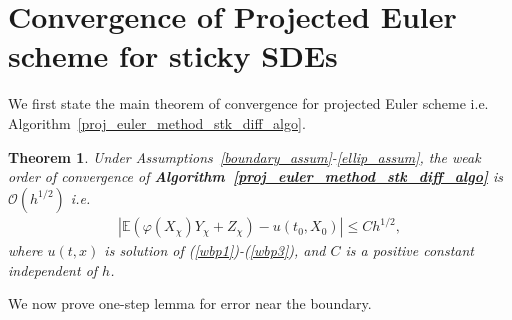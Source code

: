 \documentclass{article}
\newtheorem{theorem}{Theorem}[section]
\theoremstyle{definition}
\numberwithin{equation}{section}
\begin{document}
\section{Convergence of Projected Euler scheme for sticky SDEs}\label{sticky_proj_euler_section}

We first state the main theorem of convergence for projected Euler scheme i.e. Algorithm~\ref{proj_euler_method_stk_diff_algo}. 

\begin{theorem}\label{proj_conv_thrm}
Under Assumptions~\ref{boundary_assum}-\ref{ellip_assum}, the weak order of convergence of  \textbf{Algorithm~\ref{proj_euler_method_stk_diff_algo}} is $\mathcal{O}(h^{1/2})$ i.e. 
\begin{align}
|\mathbb{E} (\varphi(X_{\chi})Y_{\chi} + Z_{\chi}) - u(t_{0}, X_{0})| \leq Ch^{1/2}, 
\end{align}
where $ u(t,x) $ is solution of (\ref{wbp1})-(\ref{wbp3}), and $C $ is a positive constant independent of $h$. 
\end{theorem}


We now prove one-step lemma for error near the boundary. 
\end{document}
